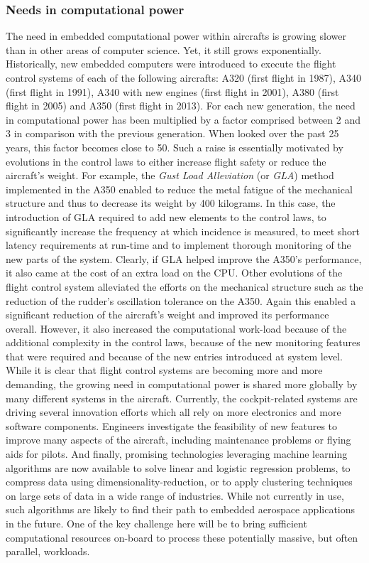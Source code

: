 \documentclass[main.tex]{subfiles}
\begin{document}
\subsubsection{Needs in computational power}
The need in embedded computational power within aircrafts is growing slower than in other areas of computer science. Yet, it still grows exponentially. Historically, new embedded computers were introduced to execute the flight control systems of each of the following aircrafts: A320 (first flight in 1987), A340 (first flight in 1991), A340 with new engines (first flight in 2001), A380 (first flight in 2005) and A350 (first flight in 2013). For each new generation, the need in computational power has been multiplied by a factor comprised between 2 and 3 in comparison with the previous generation. When looked over the past 25 years, this factor becomes close to 50. Such a raise is essentially motivated by evolutions in the control laws to either increase flight safety or reduce the aircraft's weight. For example, the \emph{Gust Load Alleviation} (or \emph{GLA}) method implemented in the A350 enabled to reduce the metal fatigue of the mechanical structure and thus to decrease its weight by 400 kilograms. In this case, the introduction of GLA required to add new elements to the control laws, to significantly increase the frequency at which incidence is measured, to meet short latency requirements at run-time and to implement thorough monitoring of the new parts of the system. Clearly, if GLA helped improve the A350's performance, it also came at the cost of an extra load on the CPU. Other evolutions of the flight control system alleviated the efforts on the mechanical structure such as the reduction of the rudder's oscillation tolerance on the A350. Again this enabled a significant reduction of the aircraft's weight and improved its performance overall. However, it also increased the computational work-load because of the additional complexity in the control laws, because of the new monitoring features that were required and because of the new entries introduced at system level.
While it is clear that flight control systems are becoming more and more demanding, the growing need in computational power is shared more globally by many different systems in the aircraft. Currently, the cockpit-related systems are driving several innovation efforts which all rely on more electronics and more software components. Engineers investigate the feasibility of new features to improve many aspects of the aircraft, including maintenance problems or flying aids for pilots.
And finally, promising technologies leveraging machine learning algorithms are now available to solve linear and logistic regression problems, to compress data using dimensionality-reduction, or to apply clustering techniques on large sets of data in a wide range of industries. While not currently in use, such algorithms are likely to find their path to embedded aerospace applications in the future. One of the key challenge here will be to bring sufficient computational resources on-board to process these potentially massive, but often parallel, workloads.
\end{document}
